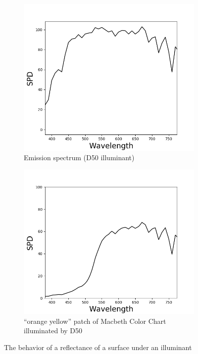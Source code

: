 \begin{figure}[t]
\begin{subfigure}[t]{0.31\textwidth}
	\includegraphics[width=\linewidth]{img/spectralRepres_emission.png}
	\caption{Emission spectrum (D50 illuminant) }
	\label{fig:spectralRepres_illuminant}
	\end{subfigure}
	\begin{subfigure}[t]{0.31\textwidth}
	\captionsetup{justification=centering}
	\includegraphics[width=\linewidth]{img/spectralRepres_combination.png}
	\caption{``orange yellow'' patch of Macbeth Color Chart illuminated by D50}
	\label{fig:spectralRepres_combination}
	\end{subfigure}
	\caption{The behavior of a reflectance of a surface under an illuminant}
	\label{fig:spectralRepresExamples}
\end{figure}

